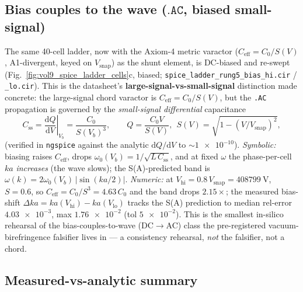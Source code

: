 \subsection{Bias couples to the wave ($\mathtt{.AC}$, biased small-signal)}
\label{subsec:vol9_app_spice_ac_biased}

The same 40-cell ladder, now with the Axiom-4 metric varactor ($C_{\mathrm{eff}} = C_0/S(V)$, A1-divergent, keyed on $V_{\mathrm{snap}}$) as the shunt element, is DC-biased and re-swept (Fig.~\ref{fig:vol9_spice_ladder_cells}c, biased; \texttt{spice\_ladder\_rung5\_bias\_hi.cir} / \texttt{\_lo.cir}). This is the datasheet's \textbf{large-signal-vs-small-signal} distinction made concrete: the large-signal chord varactor is $C_{\mathrm{eff}} = C_0/S(V)$, but the \texttt{.AC} propagation is governed by the \emph{small-signal differential} capacitance
\begin{equation}
C_{\mathrm{ss}} = \left.\frac{\mathrm{d}Q}{\mathrm{d}V}\right|_{V_b} = \frac{C_0}{S(V_b)^3},
\qquad Q = \frac{C_0 V}{S(V)},\ \ S(V) = \sqrt{1 - (V/V_{\mathrm{snap}})^2},
\label{eq:vol9_smallsignal_ceff}
\end{equation}
(verified in \texttt{ngspice} against the analytic $\mathrm{d}Q/\mathrm{d}V$ to $\sim\!\num{1e-10}$). \emph{Symbolic:} biasing raises $C_{\mathrm{eff}}$, drops $\omega_0(V_b) = 1/\sqrt{L\,C_{\mathrm{ss}}}$, and at fixed $\omega$ the phase-per-cell $ka$ \emph{increases} (the wave slows); the S(A)-predicted band is $\omega(k) = 2\omega_0(V_b)\,|\sin(ka/2)|$. \emph{Numeric:} at $V_{\mathrm{hi}} = 0.8\,V_{\mathrm{snap}} = \qty{408799}{\volt}$, $S = 0.6$, so $C_{\mathrm{eff}} = C_0/S^3 = 4.63\,C_0$ and the band drops $2.15\times$; the measured bias-shift $\Delta ka = ka(V_{\mathrm{hi}}) - ka(V_{\mathrm{lo}})$ tracks the S(A) prediction to median rel-error $\num{4.03e-3}$, max $\num{1.76e-2}$ (tol $\num{5e-2}$). This is the smallest in-silico rehearsal of the bias-couples-to-wave (DC$\to$AC) class the pre-registered vacuum-birefringence falsifier lives in --- a consistency rehearsal, \emph{not} the falsifier, not a chord.

\subsection{Measured-vs-analytic summary}
\label{subsec:vol9_app_spice_summary}

